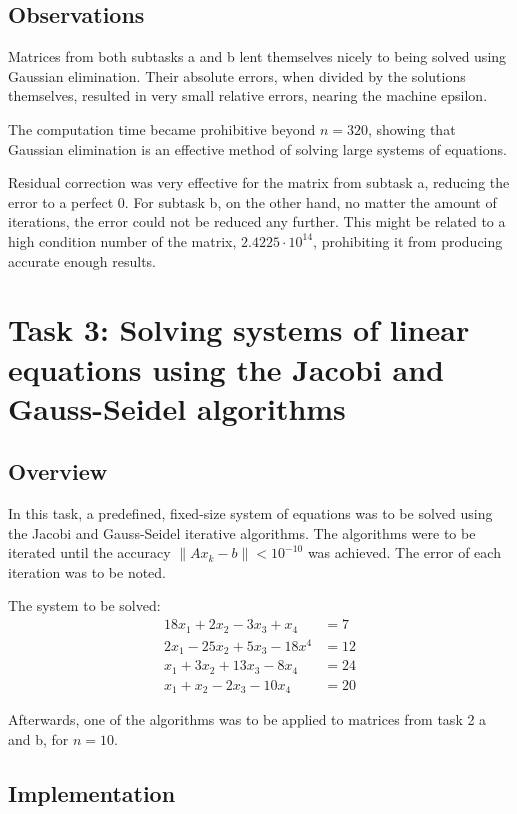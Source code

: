 \documentclass{article}
\begin{document}
	\newpage
	\subsection{Observations}
	
	Matrices from both subtasks a and b lent themselves nicely to being solved
	using Gaussian elimination. Their absolute errors, when divided by the
	solutions themselves, resulted in very small relative errors, nearing the
	machine epsilon.
	
	The computation time became prohibitive beyond $n = 320$, showing that
	Gaussian elimination is an effective method of solving large systems
	of equations.
	
	Residual correction was very effective for the matrix from subtask a,
	reducing the error to a perfect $0$. For subtask b, on the other hand, no
	matter the amount of iterations, the error could not be reduced any further.
	This might be related to a high condition number of the matrix,
	$2.4225 \cdot 10^{14}$, prohibiting it from producing accurate enough
	results.
	
	\newpage
	\section{Task 3: Solving systems of linear equations using the Jacobi and
	Gauss-Seidel algorithms}
	
	\subsection{Overview}
	
	In this task, a predefined, fixed-size system of equations was to be solved
	using the Jacobi and Gauss-Seidel iterative algorithms. The algorithms were
	to be iterated until the accuracy $\lVert Ax_k - b \rVert < 10^{-10}$ was
	achieved. The error of each iteration was to be noted.
	
	The system to be solved:
	\begin{align*}
		18x_1 + 2x_2 - 3x_3 + x_4 & = 7\\
		2x_1 - 25x_2 + 5x_3 - 18x^4 & = 12\\
		x_1 + 3x_2 + 13x_3 - 8x_4 & = 24\\
		x_1 + x_2 - 2x_3 - 10x_4 & = 20
	\end{align*}
	
	Afterwards, one of the algorithms was to be applied to matrices from task 2
	a and b, for $n = 10$.
	
	\subsection{Implementation}
	
\end{document}
